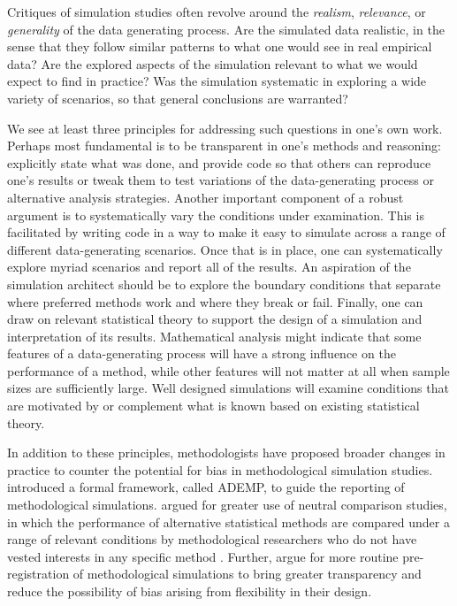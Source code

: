 \documentclass[
]{book}
\begin{document}
Critiques of simulation studies often revolve around the \emph{realism}, \emph{relevance}, or \emph{generality} of the data generating process.
Are the simulated data realistic, in the sense that they follow similar patterns to what one would see in real empirical data?
Are the explored aspects of the simulation relevant to what we would expect to find in practice?
Was the simulation systematic in exploring a wide variety of scenarios, so that general conclusions are warranted?

We see at least three principles for addressing such questions in one's own work.
Perhaps most fundamental is to be transparent in one's methods and reasoning:
explicitly state what was done, and provide code so that others can reproduce one's results or tweak them to test variations of the data-generating process or alternative analysis strategies.
Another important component of a robust argument is to systematically vary the conditions under examination.
This is facilitated by writing code in a way to make it easy to simulate across a range of different data-generating scenarios.
Once that is in place, one can systematically explore myriad scenarios and report all of the results.
An aspiration of the simulation architect should be to explore the boundary conditions that separate where preferred methods work and where they break or fail.
Finally, one can draw on relevant statistical theory to support the design of a simulation and interpretation of its results.
Mathematical analysis might indicate that some features of a data-generating process will have a strong influence on the performance of a method, while other features will not matter at all when sample sizes are sufficiently large.
Well designed simulations will examine conditions that are motivated by or complement what is known based on existing statistical theory.

In addition to these principles, methodologists have proposed broader changes in practice to counter the potential for bias in methodological simulation studies.
\citet{morris2019UsingSimulationStudies} introduced a formal framework, called ADEMP, to guide the reporting of methodological simulations.
\citet{boulesteix2013Plea} argued for greater use of neutral comparison studies, in which the performance of alternative statistical methods are compared under a range of relevant conditions by methodological researchers who do not have vested interests in any specific method \citep[see also][]{boulesteix2017evidencebased}.
Further, \citet{siepe2024SimulationStudiesMethodological} argue for more routine pre-registration of methodological simulations to bring greater transparency and reduce the possibility of bias arising from flexibility in their design.
\end{document}
